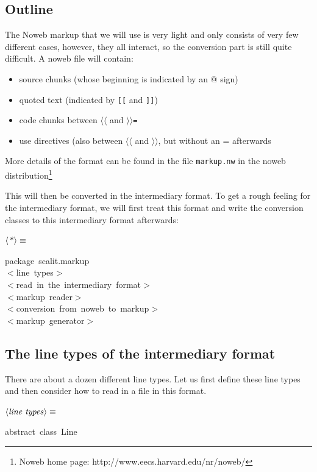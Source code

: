 \documentclass[a4paper,12pt]{article}
\begin{document}
\subsection{Outline}
The Noweb markup that we will use is very light and only consists of
very few different cases, however, they all interact, so the conversion
part is still quite difficult. A noweb file will contain:

\begin{itemize}
\item source chunks (whose beginning is indicated by an @ sign)
\item quoted text (indicated by \texttt{[[} and \texttt{]]})
\item code chunks between \texttt{$\langle$$\langle$} and \texttt{$\rangle$$\rangle$=}
\item use directives (also between \texttt{$\langle$$\langle$} and \texttt{$\rangle$$\rangle$}, but without an =
afterwards
\end{itemize}

More details of the format can be found in the file \texttt{markup.nw} in the
noweb distribution\footnote{Noweb home page: http://www.eecs.harvard.edu/nr/noweb/}

This will then be converted in the intermediary format. To get a rough feeling for
the intermediary format, we will first treat this format and write the conversion
classes to this intermediary format afterwards:

$\left<\mbox{\emph{*}}\right>\equiv$
\begin{program}{\vem package}~scalit.markup
\\[0.5em]$<$line~types$>$
\\[0.5em]$<$read~in~the~intermediary~format$>$
\\[0.5em]$<$markup~reader$>$
\\[0.5em]$<$conversion~from~noweb~to~markup$>$
\\[0.5em]$<$markup~generator$>$
\\[0.5em]\end{program}


\subsection{The line types of the intermediary format}
There are about a dozen different line types. Let us first define these
line types and then consider how to read in a file in this format.

$\left<\mbox{\emph{line types}}\right>\equiv$
\begin{program}{\vem abstract}~{\vem class}~Line
\\[0.5em]\end{program}
\end{document}

